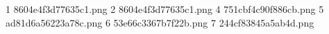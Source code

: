 1 8604e4f3d77635c1.png
2 8604e4f3d77635c1.png
4 751cbf4c90f886cb.png
5 ad81d6a56223a78c.png
6 53e66c3367b7f22b.png
7 244cf83845a5ab4d.png
